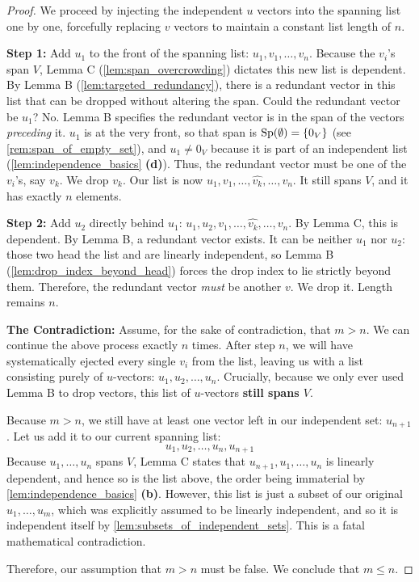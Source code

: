 \begin{proof}
We proceed by injecting the independent $u$ vectors into the spanning list one by one, forcefully replacing $v$ vectors to maintain a constant list length of $n$.

\textbf{Step 1:} Add $u_1$ to the front of the spanning list: $u_1, v_1, \dots, v_n$. Because the $v_i$'s span $V$, Lemma C (\cref{lem:span_overcrowding}) dictates this new list is dependent. By Lemma B (\cref{lem:targeted_redundancy}), there is a redundant vector in this list that can be dropped without altering the span.
Could the redundant vector be $u_1$? No. Lemma B specifies the redundant vector is in the span of the vectors \textit{preceding} it. $u_1$ is at the very front, so that span is $\operatorname{Sp}(\emptyset) = \{0_V\}$ (see \cref{rem:span_of_empty_set}), and $u_1 \ne 0_V$ because it is part of an independent list (\cref{lem:independence_basics} \textbf{(d)}). Thus, the redundant vector must be one of the $v_i$'s, say $v_k$. We drop $v_k$.
Our list is now $u_1, v_1, \dots, \widehat{v_k}, \dots, v_n$. It still spans $V$, and it has exactly $n$ elements.

\textbf{Step 2:} Add $u_2$ directly behind $u_1$: $u_1, u_2, v_1, \dots, \widehat{v_k}, \dots, v_n$. By Lemma C, this is dependent. By Lemma B, a redundant vector exists. It can be neither $u_1$ nor $u_2$: those two head the list and are linearly independent, so Lemma B\textquotesingle{} (\cref{lem:drop_index_beyond_head}) forces the drop index to lie strictly beyond them. Therefore, the redundant vector \textit{must} be another $v$. We drop it. Length remains $n$.

\textbf{The Contradiction:} Assume, for the sake of contradiction, that $m > n$. 
We can continue the above process exactly $n$ times. After step $n$, we will have systematically ejected every single $v_i$ from the list, leaving us with a list consisting purely of $u$-vectors: $u_1, u_2, \dots, u_n$.
Crucially, because we only ever used Lemma B to drop vectors, this list of $u$-vectors \textbf{still spans $V$}.

Because $m > n$, we still have at least one vector left in our independent set: $u_{n+1}$. Let us add it to our current spanning list:
\[
u_1, u_2, \dots, u_n, u_{n+1}
\]
Because $u_1, \dots, u_n$ spans $V$, Lemma C states that $u_{n+1}, u_1, \dots, u_n$ is linearly dependent, and hence so is the list above, the order being immaterial by \cref{lem:independence_basics} \textbf{(b)}. However, this list is just a subset of our original $u_1, \dots, u_m$, which was explicitly assumed to be linearly independent, and so it is independent itself by \cref{lem:subsets_of_independent_sets}. This is a fatal mathematical contradiction.

Therefore, our assumption that $m > n$ must be false. We conclude that $m \le n$.
\end{proof}

